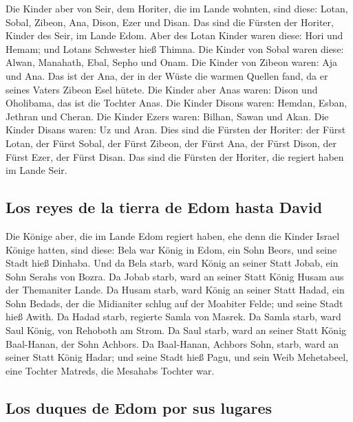  Die Kinder aber von Seir, dem Horiter, die im Lande
wohnten, sind diese: Lotan, Sobal, Zibeon, Ana, Dison, Ezer und Disan.
 Das sind die Fürsten der Horiter, Kinder des Seir, im
Lande Edom.  Aber des Lotan Kinder waren diese: Hori und
Hemam; und Lotans Schwester hieß Thimna.  Die Kinder von
Sobal waren diese: Alwan, Manahath, Ebal, Sepho und Onam.
 Die Kinder von Zibeon waren: Aja und Ana. Das ist der
Ana, der in der Wüste die warmen Quellen fand, da er seines Vaters
Zibeon Esel hütete.  Die Kinder aber Anas waren: Dison
und Oholibama, das ist die Tochter Anas.  Die Kinder
Disons waren: Hemdan, Esban, Jethran und Cheran.  Die
Kinder Ezers waren: Bilhan, Sawan und Akan.  Die Kinder
Disans waren: Uz und Aran.  Dies sind die Fürsten der
Horiter: der Fürst Lotan, der Fürst Sobal, der Fürst Zibeon, der Fürst
Ana,  der Fürst Dison, der Fürst Ezer, der Fürst Disan.
Das sind die Fürsten der Horiter, die regiert haben im Lande Seir.

\hypertarget{los-reyes-de-la-tierra-de-edom-hasta-david}{%
\subsection{Los reyes de la tierra de Edom hasta
David}\label{los-reyes-de-la-tierra-de-edom-hasta-david}}

 Die Könige aber, die im Lande Edom regiert haben, ehe
denn die Kinder Israel Könige hatten, sind diese:  Bela
war König in Edom, ein Sohn Beors, und seine Stadt hieß Dinhaba.
 Und da Bela starb, ward König an seiner Statt Jobab, ein
Sohn Serahs von Bozra.  Da Jobab starb, ward an seiner
Statt König Husam aus der Themaniter Lande.  Da Husam
starb, ward König an seiner Statt Hadad, ein Sohn Bedads, der die
Midianiter schlug auf der Moabiter Felde; und seine Stadt hieß Awith.
 Da Hadad starb, regierte Samla von Masrek.
 Da Samla starb, ward Saul König, von Rehoboth am Strom.
 Da Saul starb, ward an seiner Statt König Baal-Hanan,
der Sohn Achbors.  Da Baal-Hanan, Achbors Sohn, starb,
ward an seiner Statt König Hadar; und seine Stadt hieß Pagu, und sein
Weib Mehetabeel, eine Tochter Matreds, die Mesahabs Tochter war.

\hypertarget{los-duques-de-edom-por-sus-lugares}{%
\subsection{Los duques de Edom por sus
lugares}\label{los-duques-de-edom-por-sus-lugares}}

